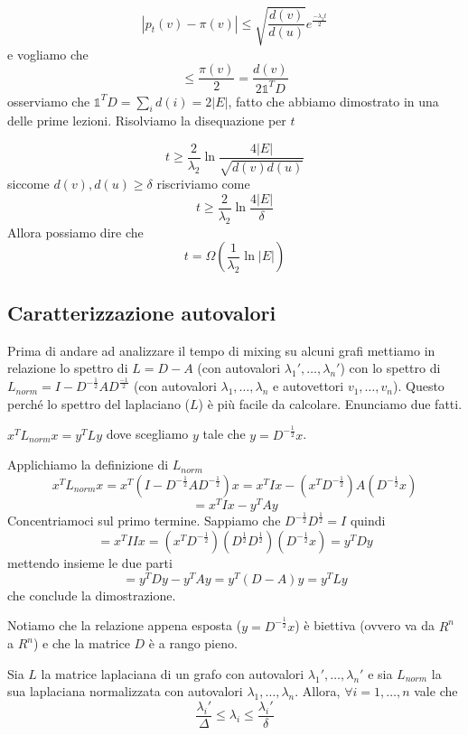 \documentclass[12pt]{report}
\begin{document}
$$|p_t(v) - \pi(v)| \leq \sqrt{\frac{d(v)}{d(u)}} e^{\frac{-\lambda_2 t}{2}}$$
e vogliamo che
$$\leq \frac{\pi(v)}{2} = \frac{d(v)}{2 \mathds{1}^T D} $$
osserviamo che $\mathds{1}^T D = \sum_i d(i) = 2 |E|$, fatto che abbiamo dimostrato in una delle prime lezioni. Risolviamo la disequazione per $t$

$$t \geq \frac{2}{\lambda_2} \ln{\frac{4|E|}{\sqrt{d(v)d(u)}}}$$
siccome $d(v),d(u) \geq \delta$ riscriviamo come
$$t \geq \frac{2}{\lambda_2} \ln{\frac{4|E|}{\delta}}$$
Allora possiamo dire che 
$$t = \Omega(\frac{1}{\lambda_2}\ln{|E|})$$

\subsection{Caratterizzazione autovalori}

Prima di andare ad analizzare il tempo di mixing su alcuni grafi mettiamo in relazione lo spettro di $L = D-A$ (con autovalori $\lambda_1',\dots,\lambda_n'$) con lo spettro di $L_{norm} = I - D^{-\frac{1}{2}} A D^{\frac{-1}{2}}$ (con autovalori $\lambda_1,\dots,\lambda_n$ e autovettori $v_1,\dots,v_n$). Questo perché lo spettro del laplaciano ($L$) è più facile da calcolare. Enunciamo due fatti.

\begin{fatto}
$x^TL_{norm}x = y^TLy$ dove scegliamo $y$ tale che $y = D^{-\frac{1}{2}}x$.
\end{fatto}
\begin{dimo}
    Applichiamo la definizione di $L_{norm}$
    $$x^T L_{norm} x = x^T(I - D^{-\frac{1}{2}} A D^{-\frac{1}{2}}) x = x^T I x  - (x^T D^{-\frac{1}{2}}) A(D^{-\frac{1}{2}} x)$$
    $$= x^T I x - y^T A y$$
    Concentriamoci sul primo termine. Sappiamo che $D^{-\frac{1}{2}} D^\frac{1}{2} = I$ quindi
    $$= x^T I I x =  (x^T  D^{-\frac{1}{2}}) (D^\frac{1}{2} D^\frac{1}{2}) (D^{-\frac{1}{2}} x) = y^T D y$$
    mettendo insieme le due parti
    $$= y^T D y - y^T A y = y^T (D - A ) y = y^T L y$$
    che conclude la dimostrazione.
\end{dimo}

Notiamo che la relazione appena esposta ($y = D^{-\frac{1}{2}}x$) è biettiva (ovvero va da $R^n$ a $R^n$) e che la matrice $D$ è a rango pieno. 

\begin{teo}
    Sia $L$ la matrice laplaciana di un grafo con autovalori $\lambda_1',\dots,\lambda_n'$ e sia $L_{norm}$ la sua laplaciana normalizzata con autovalori $\lambda_1,\dots,\lambda_n$. Allora, $\forall i = 1, \dots,n$ vale che
    $$\frac{\lambda_i'}{\Delta} \leq \lambda_i \leq \frac{\lambda_i'}{\delta}$$
\end{teo}
\end{document}
